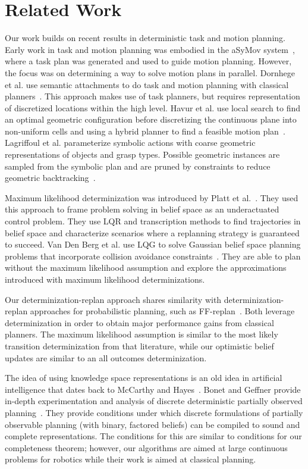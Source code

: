 \section{Related Work}
Our work builds on recent results in deterministic task and motion
planning. Early work in task and motion planning was embodied in the
aSyMov system~\cite{gravot2005asymov}, where a task plan was generated
and used to guide motion planning. However, the focus was on
determining a way to solve motion plans in parallel. Dornhege et
al. use semantic attachments to do task and motion planning with
classical planners~\cite{dornhege2012semantic}. This approach makes
use of task planners, but requires representation of discretized
locations within the high level. Havur et al. use local search to find
an optimal geometric configuration before discretizing the continuous
plane into non-uniform cells and using a hybrid planner to find a
feasible motion plan~\cite{havur2014geometric}. Lagriffoul et
al. parameterize symbolic actions with coarse geometric
representations of objects and grasp types. Possible geometric
instances are sampled from the symbolic plan and are pruned by
constraints to reduce geometric
backtracking~\cite{lagriffoul2014orientation}.

Maximum likelihood determinization was introduced by Platt et
al.~\cite{platt2010belief}. They used this approach to frame problem
solving in belief space as an underactuated control problem. They use
LQR and transcription methods to find trajectories in belief space and
characterize scenarios where a replanning strategy is guaranteed to
succeed. Van Den Berg et al. use LQG to solve Gaussian belief space
planning problems that incorporate collision avoidance
constraints~\cite{van2012motion}. They are able to plan without
the maximum likelihood assumption and explore the approximations
introduced with maximum likelihood determinizations.
 
Our determinization-replan approach shares similarity with
determinization-replan approaches for probabilistic planning, such as
FF-replan~\cite{yoon2007ff}. Both leverage determinization in order to
obtain major performance gains from classical planners. The maximum
likelihood assumption is similar to the most likely transition
determinization from that literature, while our optimistic belief
updates are similar to an all outcomes determinization.
 
The idea of using knowledge space representations is an old idea in
artificial intelligence that dates back to McCarthy and
Hayes~\cite{mccarthy1968some}. Bonet and Geffner provide in-depth
experimentation and analysis of discrete deterministic partially
observed planning~\cite{bonet2011planning}.  They provide conditions
under which discrete formulations of partially observable planning
(with binary, factored beliefs) can be compiled to sound and complete
representations. The conditions for this are similar to conditions for
our completeness theorem; however, our algorithms are aimed at large
continuous problems for robotics while their work is aimed at
classical planning.

